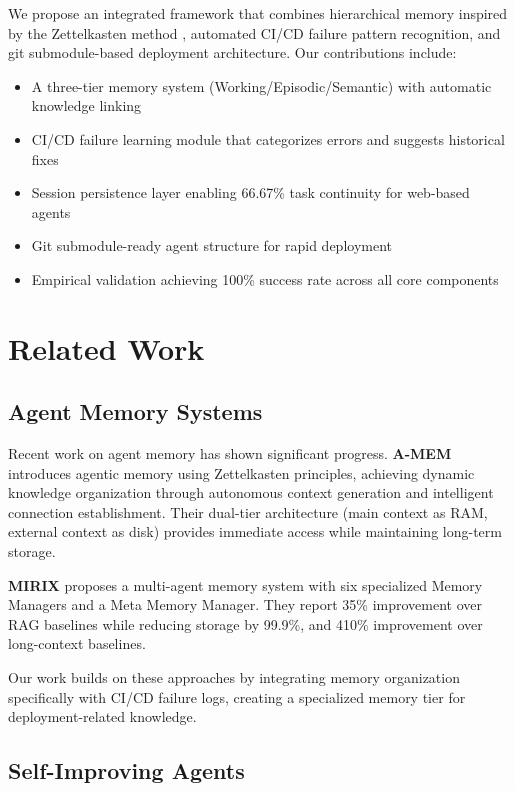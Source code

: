 \documentclass{article}
\begin{document}
We propose an integrated framework that combines hierarchical memory inspired by the Zettelkasten method \cite{amem2025}, automated CI/CD failure pattern recognition, and git submodule-based deployment architecture. Our contributions include:

\begin{itemize}
    \item A three-tier memory system (Working/Episodic/Semantic) with automatic knowledge linking
    \item CI/CD failure learning module that categorizes errors and suggests historical fixes
    \item Session persistence layer enabling 66.67\% task continuity for web-based agents
    \item Git submodule-ready agent structure for rapid deployment
    \item Empirical validation achieving 100\% success rate across all core components
\end{itemize}

\section{Related Work}

\subsection{Agent Memory Systems}

Recent work on agent memory has shown significant progress. \textbf{A-MEM} \cite{amem2025} introduces agentic memory using Zettelkasten principles, achieving dynamic knowledge organization through autonomous context generation and intelligent connection establishment. Their dual-tier architecture (main context as RAM, external context as disk) provides immediate access while maintaining long-term storage.

\textbf{MIRIX} \cite{mirix2025} proposes a multi-agent memory system with six specialized Memory Managers and a Meta Memory Manager. They report 35\% improvement over RAG baselines while reducing storage by 99.9\%, and 410\% improvement over long-context baselines.

Our work builds on these approaches by integrating memory organization specifically with CI/CD failure logs, creating a specialized memory tier for deployment-related knowledge.

\subsection{Self-Improving Agents}
\end{document}
